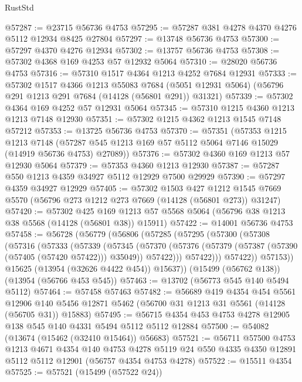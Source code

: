 \begin{lexlean}{RustStd}
\begin{coremodule}
@57287 := @23715 @56736 @4753
@57295 := @57287 @381 @4278 @4370 @4276 @5112 @12934 @8425 @27804
@57297 := @13748 @56736 @4753
@57300 := @57297 @4370 @4276 @12934
@57302 := @13757 @56736 @4753
@57308 := @57302 @4368 @169 @4253 @57 @12932 @5064
@57310 := @28020 @56736 @4753
@57316 := @57310 @1517 @4364 @1213 @4252 @7684 @12931
@57333 := @57302
    @1517
    @4366
    @1213
    @55083
    @7684
    (@5051 @12931 @5064)
    (@56796 @291 @1213 @291 @7684 (@14128 (@56801 @291)) @31321)
@57339 := @57302 @4364 @169 @4252 @57 @12931 @5064
@57345 := @57310 @1215 @4360 @1213 @1213 @7148 @12930
@57351 := @57302 @1215 @4362 @1213 @1545 @7148 @57212
@57353 := @13725 @56736 @4753
@57370 := @57351
    (@57353
      @1215
      @1213
      @7148
      (@57287 @545 @1213 @169 @57 @5112 @5064 @7146 @15029 (@14919 @56736 @4753) @27089))
@57376 := @57302 @4360 @169 @1213 @57 @12930 @5064
@57379 := @57353 @4360 @1213 @12930
@57387 := @57287 @550 @1213 @4359 @34927 @5112 @12929 @7500 @29929
@57390 := @57297 @4359 @34927 @12929
@57405 := @57302
    @1503
    @427
    @1212
    @1545
    @7669
    @5570
    (@56796 @273 @1212 @273 @7669 (@14128 (@56801 @273)) @31247)
@57420 := @57302
    @425
    @169
    @1213
    @57
    @5568
    @5064
    (@56796 @38 @1213 @38 @5568 (@14128 (@56801 @38)) @15911)
@57422 := @14001 @56736 @4753
@57458 := @56728
    (@56779
      (@56806
        (@57285
          (@57295
            (@57300
              (@57308
                (@57316
                  (@57333
                    (@57339
                      (@57345
                        (@57370
                          (@57376
                            (@57379 (@57387 (@57390 (@57405 (@57420 @57422))) @35049))
                            @57422)))
                      @57422)))
                @57422))
            @57153))
        @15625
        (@13954 (@32626 @4422 @454))
        @15637))
    (@15499 (@56762 @138))
    (@13954 (@56766 @453 @545))
@57463 := @13702 (@56773 @545 @140 @5494 @5112)
@57464 := @57458 @57463
@57482 := @56689
    @419
    @4354
    @454
    @5561
    @12906
    @140
    @5456
    @12871
    @5462
    (@56700 @31 @1213 @31 @5561 (@14128 (@56705 @31)) @15883)
@57495 := @56715 @4354 @453 @4753 @4278 @12905 @138 @545 @140 @4331 @5494 @5112 @5112 @12884
@57500 := @54082 (@13674 (@15462 (@32410 @15464)) @56683)
@57521 := @56711
    @57500
    @4753
    @1213
    @4671
    @4354
    @140
    @4753
    @4278
    @5119
    @24
    @550
    @4335
    @4350
    @12891
    @5112
    @5112
    @12901
    (@56757 @4354 @4753 @4278)
@57522 := @15511 @4354
@57525 := @57521 (@15499 (@57522 @24))

\end{coremodule}
\end{lexlean}
